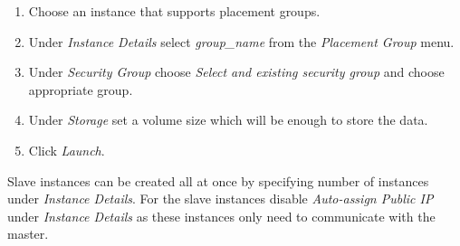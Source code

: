 \documentclass[11pt,english]{article}
\begin{document}
\begin{enumerate}
	\item Choose an instance that supports placement groups.
	\item Under \textit{Instance Details} select \textit{group\_name} from the \textit{Placement Group} menu.
	\item Under \textit{Security Group} choose \textit{Select and existing security group} and choose appropriate group.
	\item Under \textit{Storage} set a volume size which will be enough to store the data.
	\item Click \textit{Launch}.
\end{enumerate}
Slave instances can be created all at once by specifying number of instances under \textit{Instance Details}. For the slave instances disable \textit{Auto-assign Public IP} under \textit{Instance Details} as these instances only need to communicate with the master.
\end{document}
